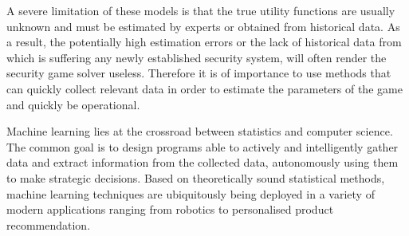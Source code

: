 A severe limitation of these models is that the true utility functions are usually unknown and must be estimated by experts or obtained from historical data. As a result, the potentially high estimation errors or the lack of historical data from which is suffering any newly established security system, will often render the security game solver useless. 
Therefore it is of importance to use methods that can quickly collect relevant data  in order to estimate the parameters of the game and quickly be operational.

Machine learning lies at the crossroad between statistics and computer science. The common goal is to design programs able to actively and intelligently gather data and extract information from the collected data, autonomously using them to make strategic decisions. Based on theoretically sound statistical methods, machine learning techniques are ubiquitously being deployed in a variety of modern applications ranging from robotics to personalised product recommendation. 



